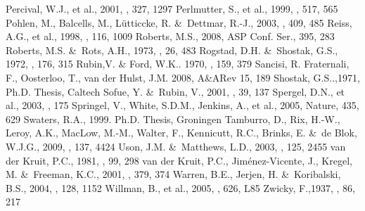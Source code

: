 \documentclass[traditabstract]{aa} %
\begin{document}
\begin{thebibliography}{}
Percival, W.J., et al., 2001, \mnras, 327, 1297
Perlmutter, S., et al., 1999, \apj, 517, 565
Pohlen, M., Balcells, M., L\"utticcke, R. \&\ Dettmar, R.-J., 2003, 
\aap, 409, 485 
Reiss, A.G., et al., 1998, \aj, 116, 1009
Roberts, M.S., 2008, ASP Conf. Ser., 395, 283  
Roberts, M.S. \&\ Rots, A.H., 1973, \aap, 26, 483
Rogstad, D.H. \&\ Shostak, G.S., 1972, \apj, 176, 315
Rubin,V. \& Ford, W.K.. 1970, \apj, 159, 379
Sancisi, R. Fraternali, F., Oosterloo, T., van der Hulst, J.M.
2008,  A\&ARev 15, 189
Shostak, G.S..,1971, Ph.D. Thesis, Caltech
Sofue, Y. \&\ Rubin, V., 2001, \araa, 39,  137
Spergel, D.N., et al., 2003, , 175 
Springel, V., White, S.D.M., Jenkins, A., et al., 2005, Nature, 435, 629
Swaters, R.A., 1999. Ph.D. Thesis, Groningen
 Tamburro, D., Rix, H.-W., Leroy, A.K., MacLow, M.-M., Walter, F., 
Kennicutt, R.C., Brinks, E. \&\ de Blok, W.J.G., 2009, \aj, 137, 4424
Uson, J.M. \&\ Matthews, L.D., 2003, \aj, 125, 2455
van der Kruit, P.C., 1981, \aap, 99, 298
van der Kruit, P.C., Jim\'enez-Vicente, J., Kregel, M. \&\ Freeman, K.C.,
2001, \aap, 379, 374
Warren, B.E., Jerjen, H. \&\ Koribalski, B.S., 2004, \aj, 128, 1152
Willman, B., et al., 2005, \apj, 626, L85
Zwicky, F.,1937, \apj, 86, 217 
\end{thebibliography}



\clearpage

\Online
\end{document}

